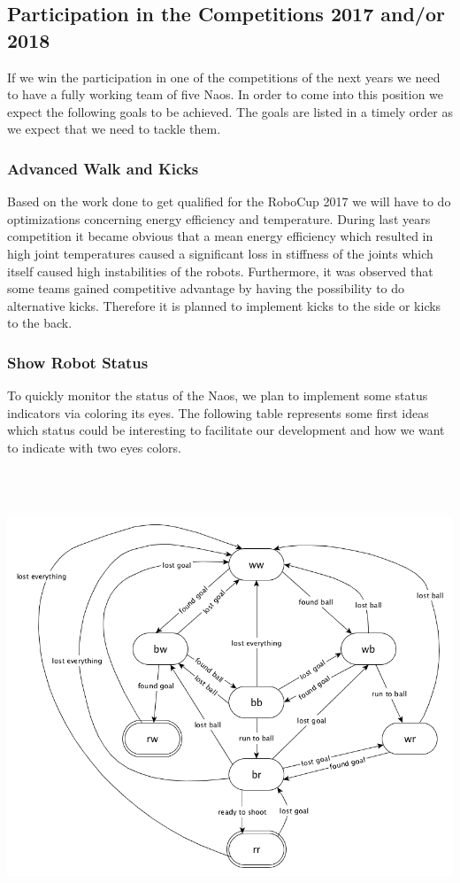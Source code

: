 \documentclass[12pt]{article}
\theoremstyle{definition}
\newcommand{\unclear}[1]{\vspace{.5em}\parbox{.9\linewidth}{\color{red}{\bf Remark: #1}}\vspace{.5em}}
\begin{document}
\subsection{Participation in the Competitions 2017 and/or 2018}
If we win the participation in one of the competitions of the next years we need to have a fully working team of five Naos. In order to come into this position we expect the following goals to be achieved. The goals are listed in a timely order as we expect that we need to tackle them.

\subsubsection{Advanced Walk and Kicks}
Based on the work done to get qualified for the RoboCup 2017 we will have to do optimizations concerning energy efficiency and temperature. During last years competition it became obvious that a mean energy efficiency which resulted in high joint temperatures caused a significant loss in stiffness of the joints which itself caused high instabilities of the robots. Furthermore, it was observed that some teams gained competitive advantage by having the possibility to do alternative kicks. Therefore it is planned to implement kicks to the side or kicks to the back.

\subsubsection{Show Robot Status}
To quickly monitor the status of the Naos, we plan to implement some status indicators via coloring its eyes. The following table represents some first ideas which status could be interesting to facilitate our development and how we want to indicate with two eyes colors.
\\[1em]
\unclear{In the next table: What is if the Nao sees the goal? What means the red/red status? What do you mean by ``the x/y state is necessary?}
\\
\unclear{Please check if the state diagram is okay, and the table beneath}\\
\includegraphics[scale=.5]{stateDiagram.png} 
\end{document}

